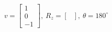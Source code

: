 \documentclass[preview]{standalone}
\begin{document}
\begin{align*}
v = \begin{bmatrix}
                        1\\
                        0\\
                        -1
                        \end{bmatrix}, \ 
                        R_z = \begin{bmatrix}
                        
                        \end{bmatrix}, \ 
                        \theta = 180^\circ
\end{align*}
\end{document}
